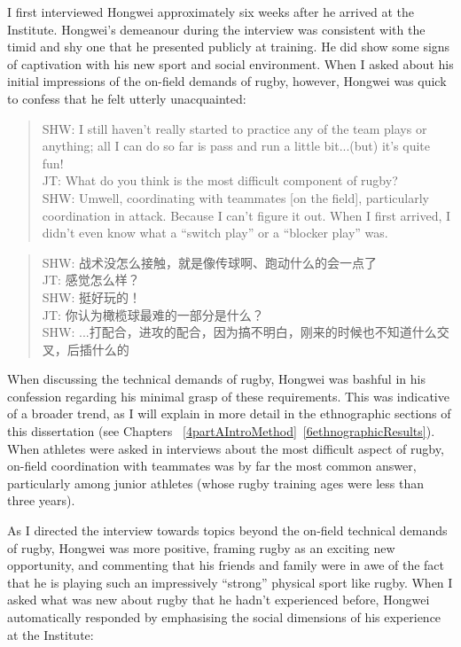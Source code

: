 \begin{CJK}{UTF8}{gbsn}
I first interviewed Hongwei approximately six weeks after he arrived at the Institute.   Hongwei's demeanour during the interview was consistent with the timid and shy one that he presented publicly at training. He did show some signs of captivation with his new sport and social environment.  When I asked about his initial impressions of the on-field demands of rugby, however, Hongwei was quick to confess that he felt utterly unacquainted:

\begin{quotation}
  SHW: I still haven’t really started to practice any of the team plays or anything; all I can do so far is pass and run a little bit...(but) it's quite fun! \\
  JT: What do you think is the most difficult component of rugby? \\
  SHW: Um\textellipsis well, coordinating with teammates [on the field], particularly coordination in attack.  Because I can't figure it out. When I first arrived, I didn’t even know what a ``switch play'' or a ``blocker play'' was.
\end{quotation}

  \begin{quotation}
    SHW: 战术没怎么接触，就是像传球啊、跑动什么的会一点了 \\
    JT: 感觉怎么样？\\
    SHW: 挺好玩的！\\
    JT: 你认为橄榄球最难的一部分是什么？ \\
    SHW: ...打配合，进攻的配合，因为搞不明白，刚来的时候也不知道什么交叉，后插什么的 \\
  \end{quotation}


When discussing the technical demands of rugby, Hongwei was bashful in his confession regarding his minimal grasp of these requirements. This was indicative of a broader trend, as I will explain in more detail in the ethnographic sections of this dissertation (see Chapters ~\ref{4partAIntroMethod}\nobreakdash~\ref{6ethnographicResults}). When athletes were asked in interviews about the most difficult aspect of rugby, on-field coordination with teammates was by far the most common answer, particularly among junior athletes (whose rugby training ages were less than three years).

As I directed the interview towards topics beyond the on-field technical demands of rugby, Hongwei was more positive, framing rugby as an exciting new opportunity, and commenting that his friends and family were in awe of the fact that he is playing such an impressively ``strong'' physical sport like rugby. When I asked what was new about rugby that he hadn't experienced before, Hongwei automatically responded by emphasising the social dimensions of his experience at the Institute:


\end{CJK}

